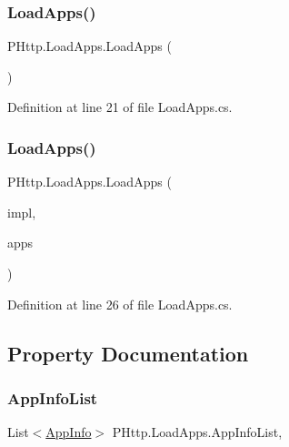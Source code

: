 \subsubsection{\texorpdfstring{Load\+Apps()}{LoadApps()}\hspace{0.1cm}{\footnotesize\ttfamily [1/2]}}
{\footnotesize\ttfamily P\+Http.\+Load\+Apps.\+Load\+Apps (\begin{DoxyParamCaption}{ }\end{DoxyParamCaption})}



Definition at line 21 of file Load\+Apps.\+cs.

\mbox{\label{class_p_http_1_1_load_apps_a0043b4841c08616b2fe013b445657278}} 
\subsubsection{\texorpdfstring{Load\+Apps()}{LoadApps()}\hspace{0.1cm}{\footnotesize\ttfamily [2/2]}}
{\footnotesize\ttfamily P\+Http.\+Load\+Apps.\+Load\+Apps (\begin{DoxyParamCaption}\item[{List$<$ \hyperlink{interface_p_http_1_1_i_p_http_application}{I\+P\+Http\+Application} $>$}]{impl,  }\item[{List$<$ \hyperlink{class_p_http_1_1_app_info}{App\+Info} $>$}]{apps }\end{DoxyParamCaption})}



Definition at line 26 of file Load\+Apps.\+cs.



\subsection{Property Documentation}
\mbox{\label{class_p_http_1_1_load_apps_af03064c830b628fe14b45d2ad2d8268e}} 
\subsubsection{\texorpdfstring{App\+Info\+List}{AppInfoList}}
{\footnotesize\ttfamily List$<$\hyperlink{class_p_http_1_1_app_info}{App\+Info}$>$ P\+Http.\+Load\+Apps.\+App\+Info\+List\hspace{0.3cm}{\ttfamily [get]}, {\ttfamily [set]}}



